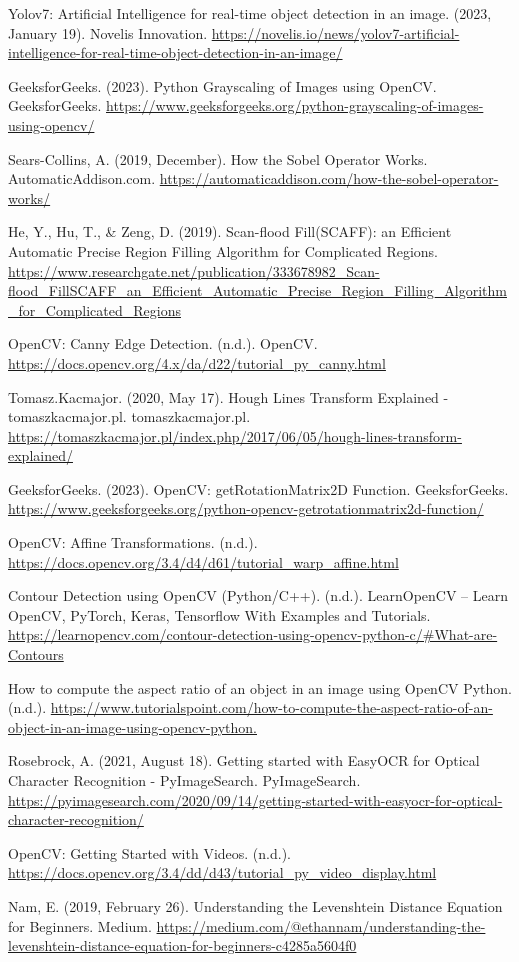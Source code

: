 \documentclass[conference]{IEEEtran}
\begin{document}
\begin{thebibliography}{00}
 Yolov7: Artificial Intelligence for real-time object detection in an image. (2023, January 19). Novelis Innovation. 
\url{https://novelis.io/news/yolov7-artificial-intelligence-for-real-time-object-detection-in-an-image/}

 GeeksforGeeks. (2023). Python  Grayscaling of Images using OpenCV. GeeksforGeeks. 
\url{https://www.geeksforgeeks.org/python-grayscaling-of-images-using-opencv/}

 Sears-Collins, A. (2019, December). How the Sobel Operator Works. AutomaticAddison.com. \url{https://automaticaddison.com/how-the-sobel-operator-works/}

 He, Y., Hu, T., \& Zeng, D. (2019). Scan-flood Fill(SCAFF): an Efficient Automatic Precise Region Filling Algorithm for Complicated Regions. \url{https://www.researchgate.net/publication/333678982_Scan-flood_FillSCAFF_an_Efficient_Automatic_Precise_Region_Filling_Algorithm_for_Complicated_Regions}

 OpenCV: Canny Edge Detection. (n.d.). OpenCV. \url{https://docs.opencv.org/4.x/da/d22/tutorial_py_canny.html}

 Tomasz.Kacmajor. (2020, May 17). Hough Lines Transform Explained - tomaszkacmajor.pl. tomaszkacmajor.pl. 
\url{https://tomaszkacmajor.pl/index.php/2017/06/05/hough-lines-transform-explained/}

 GeeksforGeeks. (2023). OpenCV:  getRotationMatrix2D  Function. GeeksforGeeks. 
\url{https://www.geeksforgeeks.org/python-opencv-getrotationmatrix2d-function/}

 OpenCV: Affine Transformations. (n.d.). \url{https://docs.opencv.org/3.4/d4/d61/tutorial_warp_affine.html}

 Contour Detection using OpenCV (Python/C++). (n.d.). LearnOpenCV – Learn OpenCV, PyTorch, Keras, Tensorflow With Examples and Tutorials. 
\url{https://learnopencv.com/contour-detection-using-opencv-python-c/#What-are-Contours}

 How to compute the aspect ratio of an object in an image using OpenCV Python. (n.d.). \url{https://www.tutorialspoint.com/how-to-compute-the-aspect-ratio-of-an-object-in-an-image-using-opencv-python.}

 Rosebrock, A. (2021, August 18). Getting started with EasyOCR for Optical Character Recognition - PyImageSearch. PyImageSearch. 
\url{https://pyimagesearch.com/2020/09/14/getting-started-with-easyocr-for-optical-character-recognition/}

 OpenCV: Getting Started with Videos. (n.d.). \url{https://docs.opencv.org/3.4/dd/d43/tutorial_py_video_display.html}

 Nam, E. (2019, February 26). Understanding the Levenshtein Distance Equation for Beginners. Medium. \url{https://medium.com/@ethannam/understanding-the-levenshtein-distance-equation-for-beginners-c4285a5604f0}

\end{thebibliography}
\end{document}
